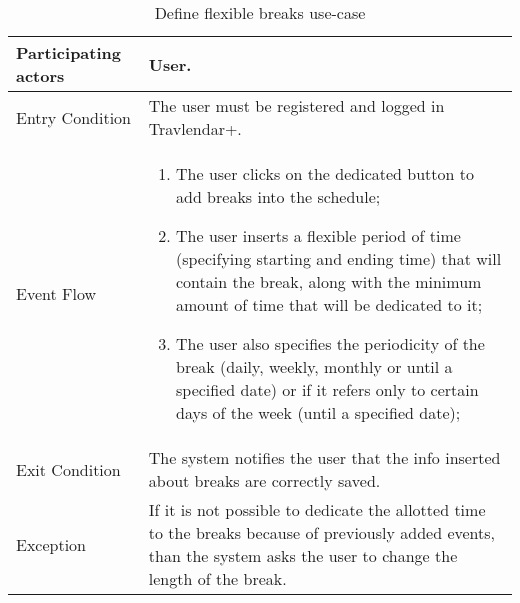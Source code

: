 \begin{table}[H]
	\begin{center}
		\begin{tabular}{ | p{} | p{} | }
		\hline
		Participating actors & User.\\
		\hline
		Entry Condition & The user must be registered and logged in Travlendar+.\\
		\hline
		Event Flow & 
			\begin{enumerate}
				\item The user clicks on the dedicated button to add breaks into the schedule;
				\item The user inserts a flexible period of time (specifying starting and ending time) that will contain the break, along with the minimum amount of time that will be dedicated to it;
				\item The user also specifies the periodicity of the break (daily, weekly, monthly or until a specified date) or if it refers only to certain days of the week (until a specified date);
			\end{enumerate} \\
		\hline
		Exit Condition &  The system notifies the user that the info inserted about breaks are correctly saved.\\
		\hline
		Exception & If it is not possible to dedicate the allotted time to the breaks because of previously added events, than the system asks the user to change the length of the break.
\\ 
		\hline
		\end{tabular}
	\end{center}
	\caption{Define flexible breaks use-case}
\end{table}
